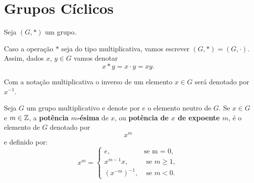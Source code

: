 \section{Grupos Cíclicos}

Seja $(G, *)$ um grupo.

Caso a opera\c{c}\~ao $*$ seja do tipo multiplicativa, vamos escrever $(G, *) = (G, \cdot)$. Assim, dados $x$, $y \in G$ vamos denotar
\[
    x * y = x \cdot y = xy.
\]

Com a nota\c{c}\~ao multiplicativa o inverso de um elemento $x \in G$ ser\'a denotado por $x^{-1}$.

\begin{definicao}
	Seja $G$ um grupo multiplicativo e denote por $e$ o elemento neutro de $G$. Se $x \in G$ e $m \in \mathbb{Z}$, a \textbf{pot\^encia $m$-\'esima} de $x$, ou \textbf{pot\^encia de $x$ de expoente $m$}, \'e o elemento de $G$ denotado por
        \[
            x^m
        \]
        e definido por:
        \[
            x^m = \begin{cases}
                    e, & \mbox{se m = 0},\\
                    x^{m-1}x, & \mbox{ se } m \ge 1,\\
                    (x^{-m})^{-1}, & \mbox{ se } m < 0. 
                   \end{cases}
        \]
\end{definicao}

